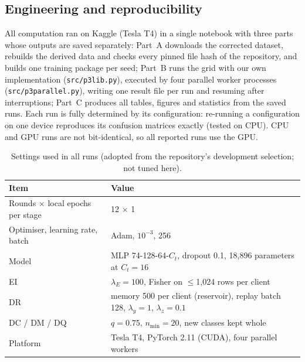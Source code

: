 \documentclass[10pt,a4paper]{article}
\begin{document}
\subsection{Engineering and reproducibility}
All computation ran on Kaggle (Tesla T4) in a single notebook with three parts whose outputs are saved separately: Part~A downloads the corrected dataset, rebuilds the derived data and checks every pinned file hash of the repository, and builds one training package per seed; Part~B runs the grid with our own implementation (\texttt{src/p3lib.py}), executed by four parallel worker processes (\texttt{src/p3parallel.py}), writing one result file per run and resuming after interruptions; Part~C produces all tables, figures and statistics from the saved runs. Each run is fully determined by its configuration: re-running a configuration on one device reproduces its confusion matrices exactly (tested on CPU). CPU and GPU runs are not bit-identical, so all reported runs use the GPU.

\begin{table}[htbp]
\centering\footnotesize
\caption{Settings used in all runs (adopted from the repository's development selection; not tuned here).}
\label{tab:hp}
\begin{tabularx}{\linewidth}{L{4.2cm}Y}
\toprule
Item & Value\\
\midrule
Rounds $\times$ local epochs per stage & 12 $\times$ 1\\
Optimiser, learning rate, batch & Adam, $10^{-3}$, 256\\
Model & MLP 74-128-64-$C_t$, dropout 0.1, 18,896 parameters at $C_t{=}16$\\
EI & $\lambda_E=100$, Fisher on $\le$1,024 rows per client\\
DR & memory 500 per client (reservoir), replay batch 128, $\lambda_y=1$, $\lambda_z=0.1$\\
DC / DM / DQ & $q=0.75$, $n_{\min}=20$, new classes kept whole\\
Platform & Tesla T4, PyTorch 2.11 (CUDA), four parallel workers\\
\bottomrule
\end{tabularx}
\end{table}

\end{document}
